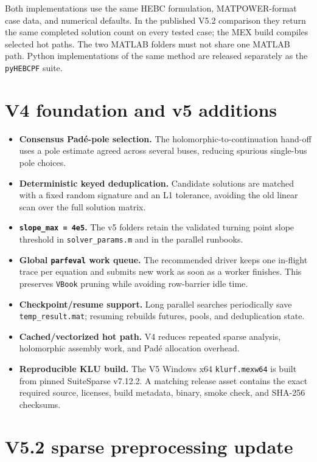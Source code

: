 \documentclass[11pt,a4paper]{article}
\newcommand{\code}[1]{\texttt{#1}}
\begin{document}
Both implementations use the same HEBC formulation, MATPOWER-format case data, and
numerical defaults. In the published V5.2 comparison they return the same completed
solution count on every tested case; the MEX build compiles selected hot paths. The two
MATLAB folders must not share one MATLAB path. Python
implementations of the same method are released separately as the \code{pyHEBCPF} suite.

\section{V4 foundation and v5 additions}

\begin{itemize}[leftmargin=1.4em]
  \item \textbf{Consensus Pad\'e-pole selection.} The holomorphic-to-continuation hand-off
        uses a pole estimate agreed across several buses, reducing spurious single-bus pole
        choices.
  \item \textbf{Deterministic keyed deduplication.} Candidate solutions are matched with a
        fixed random signature and an L1 tolerance, avoiding the old linear scan over the
        full solution matrix.
  \item \textbf{\code{slope_max = 4e5}.} The v5 folders retain the validated turning
        point slope threshold in \code{solver_params.m} and in the parallel runbooks.
  \item \textbf{Global \code{parfeval} work queue.} The recommended driver keeps one
        in-flight trace per equation and submits new work as soon as a worker finishes.
        This preserves \code{VBook} pruning while avoiding row-barrier idle time.
  \item \textbf{Checkpoint/resume support.} Long parallel searches periodically save
        \code{temp_result.mat}; resuming rebuilds futures, pools, and deduplication state.
  \item \textbf{Cached/vectorized hot path.} V4 reduces repeated sparse analysis,
        holomorphic assembly work, and Pad\'e allocation overhead.
  \item \textbf{Reproducible KLU build.} The V5 Windows x64 \code{klurf.mexw64}
        is built from pinned SuiteSparse v7.12.2. A matching release asset
        contains the exact required source, licenses, build metadata, binary,
        smoke check, and SHA-256 checksums.
\end{itemize}

\section{V5.2 sparse preprocessing update}
\end{document}

